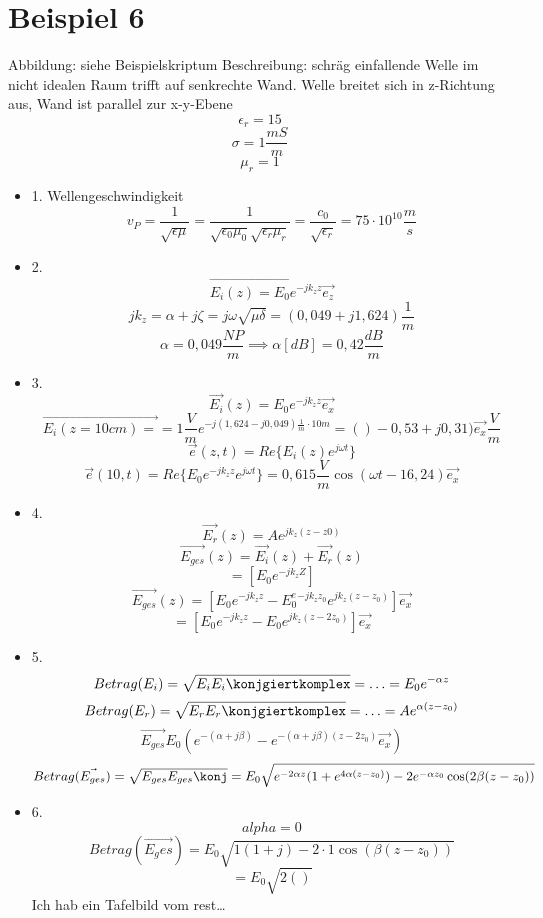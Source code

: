 \documentclass[a4paper]{article}
\begin{document}
\section*{Beispiel 6}
Abbildung: siehe Beispielskriptum
Beschreibung: schräg einfallende Welle im nicht idealen Raum trifft auf senkrechte Wand.
Welle breitet sich in z-Richtung aus, Wand ist parallel zur x-y-Ebene
\[  \epsilon_{r}=15 \]
\[ \sigma=1 \frac{mS}{m} \]
\[ \mu_{r}=1 \]
\begin{itemize}
    \item 1. Wellengeschwindigkeit
        \[ v_{P}=\frac{1}{\sqrt{\epsilon\mu}}=\frac{1}{\sqrt{\epsilon_{0}\mu_{0}} \sqrt{\epsilon_{r}\mu_{r}} }=\frac{c_{0}}{\sqrt{\epsilon_{r}} } =75\cdot 10^{10}\frac{m}{s}\]
    \item 2.
        \[ \vec{E_{i}(z)=E_{0}e^{-jk_{z}z}}\vec{e_{z}} \]
        \[ jk_{z}=\alpha+j\zeta=j\omega\sqrt{\mu\delta} =(0,049+j1,624)\frac{1}{m} \]
        \[ \alpha=0,049  \frac{NP}{m} \implies \alpha[dB]=0,42 \frac{dB}{m} \]
    \item 3. 
        \[ \vec{E_{i}}(z)=E_{0}e^{-jk_{z}z}\vec{e_{x}} \]
        \[ \vec{E_{i}(z=10cm)=}=1 \frac{V}{m}e^{-j(1,624-j0,049)\frac{1}{m}\cdot 10m}=()-0,53+j0,31)\vec{e_{x}}\frac{V}{m}\]
        \[ \vec{e}(z,t)=Re\{E_{i}(z)e^{j\omega t}\} \]
        \[ \vec{e}(10,t)=Re\{E_{0}e^{-jk_{z}z}e^{j\omega t}\} = 0,615 \frac{V}{m}\cos(\omega t - 16,24)\vec{e_{x}}\]
    \item 4.
        \[ \vec{E_{r}}(z)=Ae^{jk_{z}(z-z0)} \]
        \[ \vec{E_{ges}}(z)=\vec{E_{i}}(z)+\vec{E_{r}}(z) \]
        \[ =[E_{0}e^{-jk_{z}Z}] \]
        \[ \vec{E_{ges}}(z)=[E_{0}e^{-jk_{z}z}-E_{0}^e^{-jk_{z}z_{0}}e^{jk_{z}(z-z_0)}] \vec{e_{x}}\]
        \[ =[E_{0}e^{-jk_{z}z}-E_{0}e^{jk_{z}(z-2z_0)}]\vec{e_{x}} \]
        
    \item 5.
        \[ Betrag(E_{i})=\sqrt{E_{i}E_{i}\konjgiertkomplex}=\ldots=E_{0}e^{-\alpha z}\]
        \[ Betrag(E_{r})=\sqrt{E_{r}E_{r}\konjgiertkomplex}=\ldots=Ae^{\alpha(z-z_{0})} \]
        \[ \vec{E_{ges}}E_{0}(e^{-(\alpha+j\beta)}-e^{-(\alpha+j\beta)(z-2z_{0})}\vec{e_{x}}) \]
        \[ Betrag(\vec{E_{ges}})=\sqrt{E_{ges}E_{ges}\konj}=E_{0}\sqrt{e^{-2\alpha z}(1+e^{4\alpha (z-z_{0})})-2e^{-\alpha z_{0}}\cos(2\beta(z-z_{0}))}  \]
    \item 6.
        \[ alpha = 0 \]
        \[ Betrag(\vec{E_ges})=E_{0}\sqrt{1(1+j)-2\cdot 1\cos(\beta(z-z_{0}))} \]
        \[ =E_{0}\sqrt{2()}  \]
        Ich hab ein Tafelbild vom rest\ldots
        
        
        
        
        
        
        
        
        
        
        
        
        
        
\end{itemize}
\end{document}
